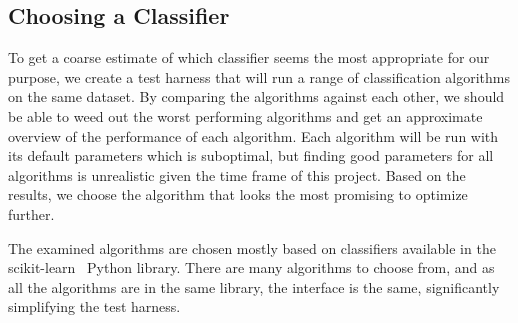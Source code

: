 



\subsection{Choosing a Classifier}\label{choosing_classifier}
To get a coarse estimate of which classifier seems the most appropriate for our purpose, we create a test harness that will run a range of classification algorithms on the same dataset. By comparing the algorithms against each other, we should be able to weed out the worst performing algorithms and get an approximate overview of the performance of each algorithm. Each algorithm will be run with its default parameters which is suboptimal, but finding good parameters for all algorithms is unrealistic given the time frame of this project. Based on the results, we choose the algorithm that looks the most promising to optimize further.

The examined algorithms are chosen mostly based on classifiers available in the scikit-learn~\cite{scikit-learn} Python library. There are many algorithms to choose from, and as all the algorithms are in the same library, the interface is the same, significantly simplifying the test harness.


